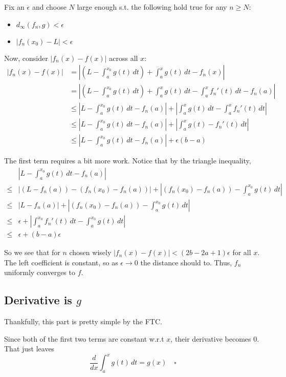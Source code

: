 \documentclass[12pt]{article}
\begin{document}
Fix an $\epsilon$ and choose $N$ large enough s.t. the following hold true for any $n \ge N$:
\begin{itemize}[nolistsep]
    \item $d_\infty(f_n, g) < \epsilon$
    \item $|f_n(x_0)-L| < \epsilon$
\end{itemize}

Now, consider $|f_n(x)-f(x)|$ across all $x$:
\begin{align*}
    |f_n(x)-f(x)|
    &= \left|\left(L-\int_{a}^{x_0} g(t)\,dt\right)+\int_{a}^{x} g(t)\,dt-f_n(x)\right| \\
    &= \left|\left(L-\int_{a}^{x_0} g(t)\,dt\right)+\int_{a}^{x} g(t)\,dt-\int_{a}^{x} f_n'(t)\,dt-f_n(a)\right| \\
    &\le \left|L-\int_{a}^{x_0} g(t)\,dt-f_n(a)\right|+\left|\int_{a}^{x} g(t)\,dt-\int_{a}^{x} f_n'(t)\,dt\right| \\
    &\le \left|L-\int_{a}^{x_0} g(t)\,dt-f_n(a)\right|+\left|\int_{a}^{x} g(t)-f_n'(t)\,dt\right| \\
    &\le \left|L-\int_{a}^{x_0} g(t)\,dt-f_n(a)\right|+\epsilon(b-a)
\end{align*}

The first term requires a bit more work.
Notice that by the triangle inequality,
\begin{align*}
    &\left|L-\int_{a}^{x_0} g(t)\,dt-f_n(a)\right| \\
    \le{} & |(L-f_n(a))-(f_n(x_0)-f_n(a))|+\left|(f_n(x_0)-f_n(a))-\int_{a}^{x_0} g(t)\,dt\right| \\
    \le{} & |L-f_n(a)|+\left|(f_n(x_0)-f_n(a))-\int_{a}^{x_0} g(t)\,dt\right| \\
    \le{} & \epsilon+\left|\int_{a}^{x_0} f_n'(t)\,dt-\int_{a}^{x_0} g(t)\,dt\right| \\
    \le{} & \epsilon + (b-a)\epsilon
\end{align*}

So we see that for $n$ chosen wisely $|f_n(x)-f(x)|<(2b-2a+1)\epsilon$ for all $x$.
The left coefficient is constant, so as $\epsilon \to 0$ the distance should to.
Thus, $f_n$ uniformly converges to $f$.

\subsection{Derivative is \texorpdfstring{$g$}{g}}

Thankfully, this part is pretty simple by the FTC.

Since both of the first two terms are constant w.r.t $x$, their derivative becomes $0$.
That just leaves
\[\frac{d}{dx} \int_{a}^{x} g(t)\,dt = g(x)\quad\square\]
\end{document}
